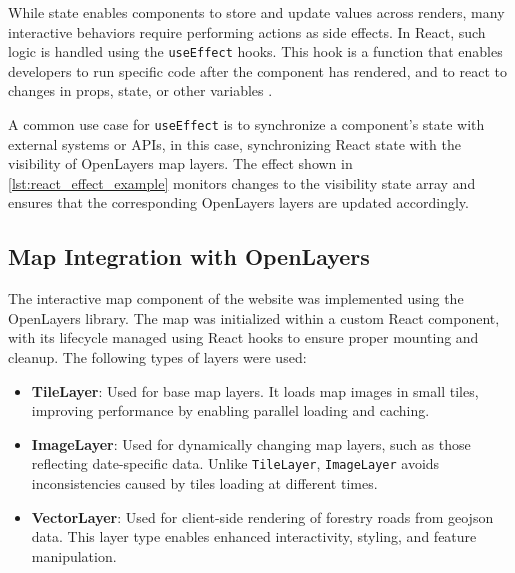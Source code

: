\begin{figure}[h]

\end{figure}

While state enables components to store and update values across renders, many interactive behaviors require performing actions as side effects. In React, such logic is handled using the \texttt{useEffect} hooks. This hook is a function that enables developers to run specific code after the component has rendered, and to react to changes in props, state, or other variables \cite{react_useEffect}.

A common use case for \texttt{useEffect} is to synchronize a component's state with external systems or APIs, in this case, synchronizing React state with the visibility of OpenLayers map layers. The effect shown in \autoref{lst:react_effect_example} monitors changes to the visibility state array and ensures that the corresponding OpenLayers layers are updated accordingly.

\begin{figure}[h]

\end{figure}

\subsection{Map Integration with OpenLayers}

The interactive map component of the website was implemented using the OpenLayers library. The map was initialized within a custom React component, with its lifecycle managed using React hooks to ensure proper mounting and cleanup. The following types of layers were used:

\begin{itemize}
    \item \textbf{TileLayer}: Used for base map layers. It loads map images in small tiles, improving performance by enabling parallel loading and caching.
    \item \textbf{ImageLayer}: Used for dynamically changing map layers, such as those reflecting date-specific data. Unlike \texttt{TileLayer}, \texttt{ImageLayer} avoids inconsistencies caused by tiles loading at different times.
    \item \textbf{VectorLayer}: Used for client-side rendering of forestry roads from \gls{geojson} data. This layer type enables enhanced interactivity, styling, and feature manipulation.
\end{itemize}

